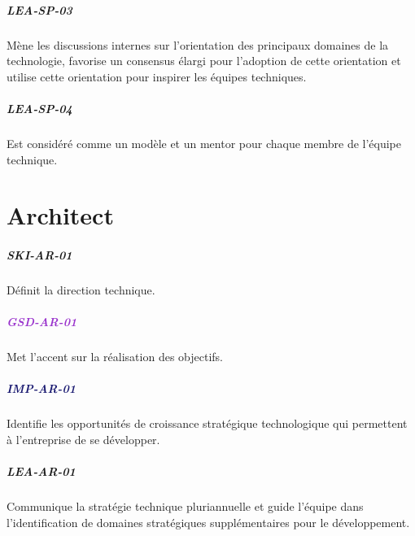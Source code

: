 \documentclass[a4paper, french, openany, 12pt]{book}
\newcommand\dex[1]{\textcolor{BrickRed}{\textbf{\uppercase{ski-{#1}}}}}
\newcommand\str[1]{\textcolor{DarkOrchid}{\textbf{\uppercase{gsd-{#1}}}}}
\newcommand\wis[1]{\textcolor{MidnightBlue}{\textbf{\uppercase{imp-{#1}}}}}
\newcommand\cha[1]{\textcolor{OliveGreen}{\textbf{\uppercase{lea-{#1}}}}}
\begin{document}
\begin{multicols}{2}
  \paragraph*{\cha{sp-03}}

  Mène les discussions internes sur l'orientation des principaux domaines de la technologie, favorise un consensus élargi
  pour l'adoption de cette orientation et utilise cette orientation pour inspirer les équipes techniques.
  
  \paragraph*{\cha{sp-04}}

  Est considéré comme un modèle et un mentor pour chaque membre de l'équipe technique.

\end{multicols}

\chapter{Architect}

\begin{multicols}{2}

  \paragraph*{\dex{ar-01}}

  Définit la direction technique.

  \paragraph*{\str{ar-01}}

  Met l'accent sur la réalisation des objectifs.

  \paragraph*{\wis{ar-01}}

  Identifie les opportunités de croissance stratégique technologique qui permettent à l'entreprise de se développer.

  \paragraph*{\cha{ar-01}}

  Communique la stratégie technique pluriannuelle et guide l'équipe dans l'identification de domaines stratégiques 
  supplémentaires pour le développement.

\end{multicols}
\end{document}
